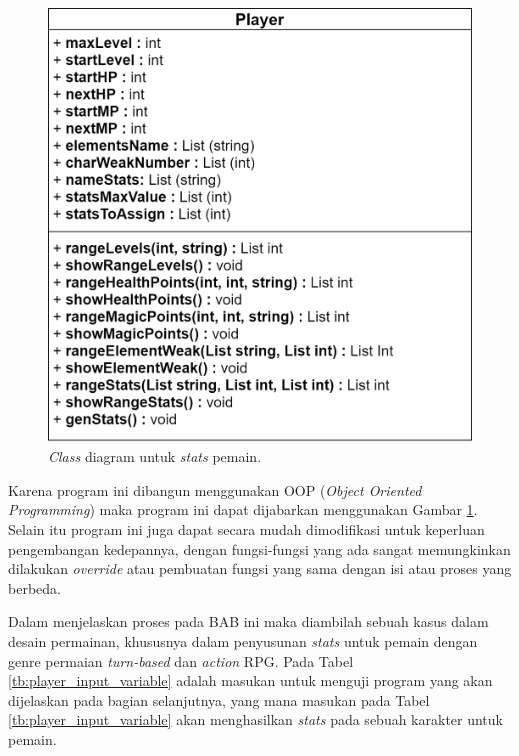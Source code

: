 \begin{figure} [!h] \centering
	\includegraphics[scale=0.25]{img/player_uml.png}
	\caption{\textit{Class} diagram untuk \textit{stats} pemain.}
	\label{fig:player_uml}
\end{figure}

Karena program ini dibangun menggunakan OOP (\textit{Object Oriented Programming}) maka program ini dapat dijabarkan menggunakan Gambar \ref{fig:player_uml}. Selain itu program ini juga dapat secara mudah dimodifikasi untuk keperluan pengembangan kedepannya, dengan fungsi-fungsi yang ada sangat memungkinkan dilakukan \textit{override} atau pembuatan fungsi yang sama dengan isi atau proses yang berbeda.
\vspace{1ex}

Dalam menjelaskan proses pada BAB ini maka diambilah sebuah kasus dalam desain permainan, khususnya dalam penyusunan \textit{stats} untuk pemain dengan genre permaian \textit{turn-based} dan \textit{action} RPG. Pada Tabel \ref{tb:player_input_variable} adalah masukan untuk menguji program yang akan dijelaskan pada bagian selanjutnya, yang mana masukan pada Tabel \ref{tb:player_input_variable} akan menghasilkan \textit{stats} pada sebuah karakter untuk pemain.
\vspace{1ex}


